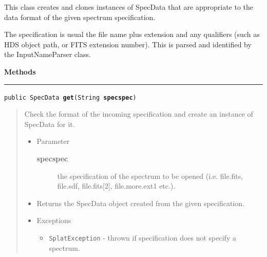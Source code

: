 \documentclass[twoside,11pt]{article}
\renewcommand{\_}{\texttt{\symbol{95}}}
\newcommand{\method}[1]{\texttt{#1}}
\newenvironment{desc}{\begin{quote}}{\end{quote}}
\newcommand{\methods}{
   \par\textbf{\large{Methods}}\\
   \hrule
}
\begin{document}


{This class creates and clones instances of SpecData that are
 appropriate to the data format of the given spectrum specification.

 The specification is usual the file name plus extension and any
 qualifiers (such as HDS object path, or FITS extension
 number). This is parsed and identified by the InputNameParser
 class.}
\methods
\method{public SpecData \textbf{get}(\texttt{String} \textbf{specspec})\label{l123}\label{l124}}
\begin{desc}Check the format of the incoming specification and create an
  instance of SpecData for it.
\begin{itemize}
\item{Parameter
  \begin{description}
   \item[\textbf{specspec}]{the specification of the spectrum to be
                  opened (i.e. file.fits, file.sdf,
                  file.fits[2], file.more.ext\_1 etc.).}
  \end{description}}
\end{itemize}
\begin{itemize}
\item{Returns the SpecData object created from the given
          specification. }
\item{{Exceptions}
  \begin{itemize}
   \item{\vspace{-.6ex}\texttt{SplatException} - thrown if specification does not
             specify a spectrum.}
  \end{itemize}
}
\end{itemize}
\end{desc}
\end{document}
